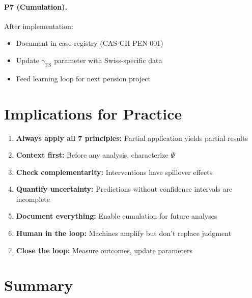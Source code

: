\paragraph{P7 (Cumulation).} After implementation:
\begin{itemize}[nosep]
    \item Document in case registry (CAS-CH-PEN-001)
    \item Update $\gamma_{\text{FS}}$ parameter with Swiss-specific data
    \item Feed learning loop for next pension project
\end{itemize}


\section{Implications for Practice}
\label{sec:pr-practice}

\begin{tcolorbox}[colback=green!5!white, colframe=green!75!black,
    title=Practical Implications]
\begin{enumerate}
    \item \textbf{Always apply all 7 principles:} Partial application yields partial results
    \item \textbf{Context first:} Before any analysis, characterize $\Psi$
    \item \textbf{Check complementarity:} Interventions have spillover effects
    \item \textbf{Quantify uncertainty:} Predictions without confidence intervals are incomplete
    \item \textbf{Document everything:} Enable cumulation for future analyses
    \item \textbf{Human in the loop:} Machines amplify but don't replace judgment
    \item \textbf{Close the loop:} Measure outcomes, update parameters
\end{enumerate}
\end{tcolorbox}


\section{Summary}
\label{sec:pr-summary}


